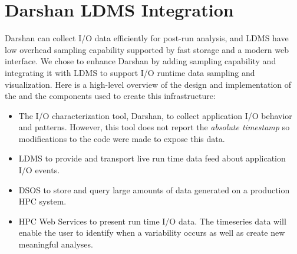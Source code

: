 \section{Darshan LDMS Integration}
\label{sec:DarshanLDMSIntegration}

Darshan can collect I/O data efficiently for post-run analysis, and LDMS have low overhead sampling capability supported by fast storage and a modern web interface. We chose to enhance Darshan by adding sampling capability and integrating it with LDMS to support I/O runtime data sampling and visualization. Here is a high-level overview of the design and implementation of the \Darshan and the components used to create this infrastructure:
\begin{itemize}
	\item The I/O characterization tool, Darshan, to collect application I/O behavior and patterns. However, this tool does not report the \emph{absolute timestamp} so modifications to the code were made to expose this data.
	\item LDMS to provide and transport live run time data feed about application I/O events.~\cite{ldmsgithubwiki}
	\item DSOS to store and query large amounts of data generated on a production HPC system.~\cite{sosgithub}
	\item HPC Web Services to present run time I/O data. The timeseries data will enable the user to identify when a variability occurs as well as create new meaningful analyses.~\cite{ClusterAV}
\end{itemize}

